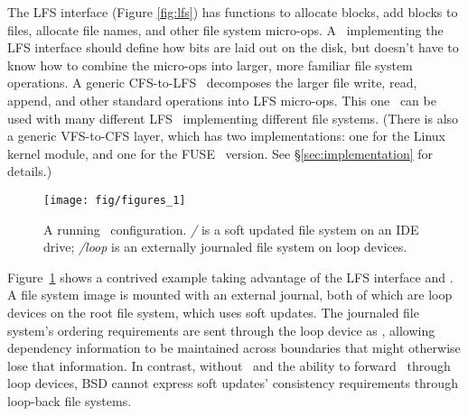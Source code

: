 The LFS interface (Figure \ref{fig:lfs}) has functions to allocate blocks, add
blocks to files, allocate file names, and other file system micro-ops. A
\module\ implementing the LFS interface should define how bits are laid out on
the disk, but doesn't have to know how to combine the micro-ops into larger,
more familiar file system operations. A generic CFS-to-LFS \module\ decomposes
the larger file write, read, append, and other standard operations into LFS
micro-ops. This one \module\ can be used with many different LFS \modules\
implementing different file systems. (There is also a generic VFS-to-CFS layer,
which has two implementations: one for the Linux kernel module, and one for the
FUSE~\cite{fuse} version. See \S\ref{sec:implementation} for details.)

\begin{figure}[tb]
  \centering
  \texttt{[image: fig/figures\_1]}
  \caption{A running \Kudos\ configuration. {\it/} is a soft updated
    file system on an IDE drive; {\it/loop} is an externally journaled
    file system on loop devices.}
  \label{fig:kfs-graph}
\end{figure}

Figure~\ref{fig:kfs-graph} shows a contrived example taking advantage of the LFS
interface and \chdescs. A file system image is mounted with an external journal,
both of which are loop devices on the root file system, which uses soft updates.
The journaled file system's ordering requirements are sent through the loop
device as \chdescs, allowing dependency information to be maintained across
boundaries that might otherwise lose that information. In contrast, without
\chdescs\ and the ability to forward \chdescs\ through loop devices, BSD cannot
express soft updates' consistency requirements through loop-back file systems.
